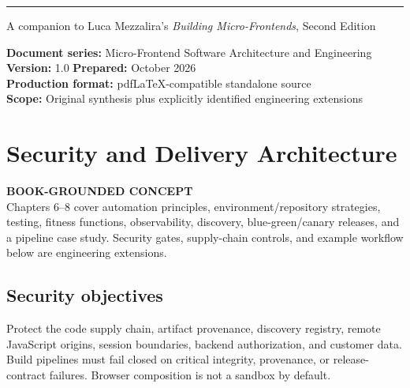 \documentclass[11pt,letterpaper,oneside]{report}
\newcommand{\based}[1]{\begin{sourcebox}\textbf{BOOK-GROUNDED CONCEPT}\\#1\end{sourcebox}}
\begin{document}
\hypersetup{pageanchor=false}%
\begin{titlepage}\thispagestyle{empty}
\vspace{27pt}\noindent\color{blue}\rule{0.75\textwidth}{1.4pt}
\vspace{23pt}\par{\large\sffamily A companion to Luca Mezzalira's \emph{Building Micro-Frontends}, Second Edition}\par
\vfill\noindent\textbf{Document series:} Micro-Frontend Software Architecture and Engineering\\
\textbf{Version:} 1.0 \quad \textbf{Prepared:} October 2026\\
\textbf{Production format:} pdfLaTeX-compatible standalone source\\
\textbf{Scope:} Original synthesis plus explicitly identified engineering extensions
\end{titlepage}\hypersetup{pageanchor=true}
\tableofcontents\clearpage{}

\chapter{Security and Delivery Architecture}
\based{Chapters 6--8 cover automation principles, environment/repository strategies, testing, fitness functions, observability, discovery, blue-green/canary releases, and a pipeline case study. Security gates, supply-chain controls, and example workflow below are engineering extensions.}
\section{Security objectives}
Protect the code supply chain, artifact provenance, discovery registry, remote JavaScript origins, session boundaries, backend authorization, and customer data. Build pipelines must fail closed on critical integrity, provenance, or release-contract failures. Browser composition is not a sandbox by default.
\end{document}
